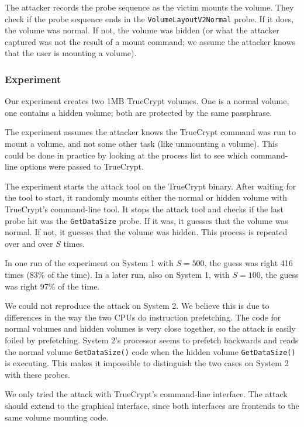 \documentclass[letterpaper,twocolumn,10pt]{article}
\begin{document}
The attacker records the probe sequence as the victim mounts the volume. They
check if the probe sequence ends in the \texttt{VolumeLayoutV2Normal} probe. If
it does, the volume was normal. If not, the volume was hidden (or what the
attacker captured was not the result of a mount command; we assume the attacker
knows that the user is mounting a volume).

\subsubsection{Experiment}

Our experiment creates two 1MB TrueCrypt volumes. One is a normal volume, one
contains a hidden volume; both are protected by the same passphrase.

The experiment assumes the attacker knows the TrueCrypt command was run to mount
a volume, and not some other task (like unmounting a volume). This could be done
in practice by looking at the process list to see which command-line options
were passed to TrueCrypt.

The experiment starts the attack tool on the TrueCrypt binary. After waiting for
the tool to start, it randomly mounts either the normal or hidden volume with
TrueCrypt's command-line tool. It stops the attack tool and checks if the last
probe hit was the \texttt{GetDataSize} probe. If it was, it guesses that the
volume was normal. If not, it guesses that the volume was hidden. This process
is repeated over and over $S$ times.

In one run of the experiment on System 1 with
$S=500$, the guess was right 416 times (83\% of the time). In a later
run, also on System 1, with $S=100$, the guess was
right 97\% of the time.

We could not reproduce the attack on System 2. We believe this is due to
differences in the way the two CPUs do instruction prefetching. The code for
normal volumes and hidden volumes is very close together, so the attack is
easily foiled by prefetching. System 2's processor seems to prefetch backwards
and reads the normal volume \texttt{GetDataSize()} code when the hidden volume
\texttt{GetDataSize()} is executing. This makes it impossible to distinguish the
two cases on System 2 with these probes.

We only tried the attack with TrueCrypt's command-line interface. The attack
should extend to the graphical interface, since both interfaces are frontends to
the same volume mounting code. 
\end{document}
